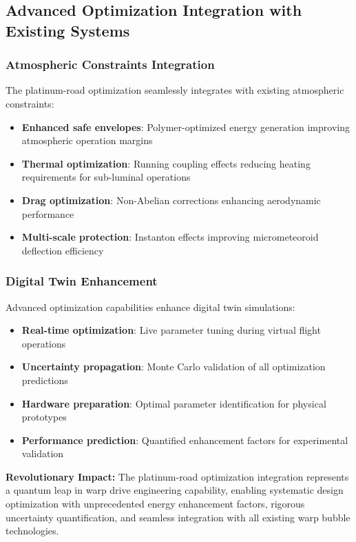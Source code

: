 \documentclass[11pt]{article}
\begin{document}
\subsection{Advanced Optimization Integration with Existing Systems}

\subsubsection{Atmospheric Constraints Integration}
The platinum-road optimization seamlessly integrates with existing atmospheric constraints:
\begin{itemize}
    \item \textbf{Enhanced safe envelopes}: Polymer-optimized energy generation improving atmospheric operation margins
    \item \textbf{Thermal optimization}: Running coupling effects reducing heating requirements for sub-luminal operations
    \item \textbf{Drag optimization}: Non-Abelian corrections enhancing aerodynamic performance
    \item \textbf{Multi-scale protection}: Instanton effects improving micrometeoroid deflection efficiency
\end{itemize}

\subsubsection{Digital Twin Enhancement}
Advanced optimization capabilities enhance digital twin simulations:
\begin{itemize}
    \item \textbf{Real-time optimization}: Live parameter tuning during virtual flight operations
    \item \textbf{Uncertainty propagation}: Monte Carlo validation of all optimization predictions
    \item \textbf{Hardware preparation}: Optimal parameter identification for physical prototypes
    \item \textbf{Performance prediction}: Quantified enhancement factors for experimental validation
\end{itemize}

\textbf{Revolutionary Impact:} The platinum-road optimization integration represents a quantum leap in warp drive engineering capability, enabling systematic design optimization with unprecedented energy enhancement factors, rigorous uncertainty quantification, and seamless integration with all existing warp bubble technologies.
\end{document}
